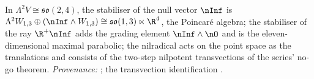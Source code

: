 In $\Lambda^2 V \cong \mathfrak{so}(2,4)$, the stabiliser of the null vector $\nInf$ is $\Lambda^2 W_{1,3} \oplus (\nInf\wedge W_{1,3}) \cong \mathfrak{so}(1,3)\ltimes\R^4$, the Poincar\'e algebra; the stabiliser of the ray $\R^+\nInf$ adds the grading element $\nInf\wedge\nO$ and is the eleven-dimensional maximal parabolic; the nilradical acts on the point space as the translations and consists of the two-step nilpotent transvections of the series' no-go theorem. \emph{Provenance:} \cite[Prop.~4.3]{ButlerT6}; the transvection identification \cite[Thm.~4.2]{ButlerT1}.
